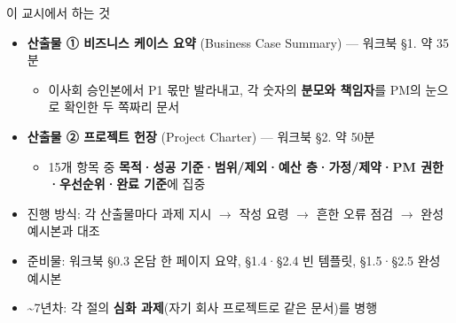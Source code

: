 \begin{frame}[allowframebreaks=1.0]{이 교시에서 하는 것}
\small
\begin{itemize}
\item\relax \textbf{산출물 ① 비즈니스 케이스 요약} (Business Case Summary) — 워크북 §1. 약 35분
\par\nobreak
\begin{itemize}
\item\relax 이사회 승인본에서 P1 몫만 발라내고, 각 숫자의 \textbf{분모와 책임자}를 PM의 눈으로 확인한 두 쪽짜리 문서
\end{itemize}
\item\relax \textbf{산출물 ② 프로젝트 헌장} (Project Charter) — 워크북 §2. 약 50분
\par\nobreak
\begin{itemize}
\item\relax 15개 항목 중 \textbf{목적·성공 기준·범위/제외·예산 층·가정/제약·PM 권한·우선순위·완료 기준}에 집중
\end{itemize}
\item\relax 진행 방식: 각 산출물마다 과제 지시 $\rightarrow$ 작성 요령 $\rightarrow$ 흔한 오류 점검 $\rightarrow$ 완성 예시본과 대조
\item\relax 준비물: 워크북 §0.3 온담 한 페이지 요약, §1.4·§2.4 빈 템플릿, §1.5·§2.5 완성 예시본
\item{}\textasciitilde{}7년차: 각 절의 \textbf{심화 과제}(자기 회사 프로젝트로 같은 문서)를 병행
\end{itemize}
\end{frame}


